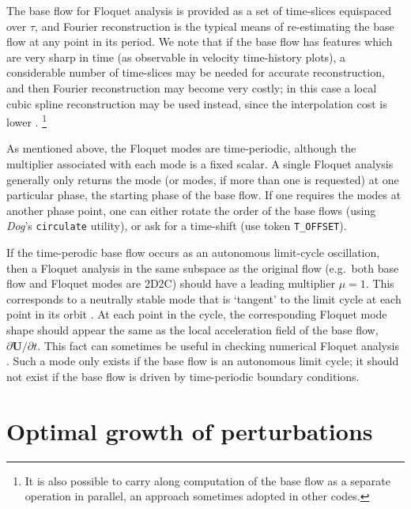 \documentclass[11pt,a4paper]{report}
\newcommand\Rey{\mbox{\textit{Re}}}
\newcommand{\eg}{e.g.\ }
\newcommand\Ubase{{\bm{U}}}
\newcommand{\Dog}{\emph{Dog}}
\begin{document}
The base flow for Floquet analysis is provided as a set of time-slices
equispaced over $\tau$, and Fourier reconstruction is the typical
means of re-estimating the base flow at any point in its period.  We
note that if the base flow has features which are very sharp in time
(as observable in velocity time-history plots), a considerable number
of time-slices may be needed for accurate reconstruction, and then
Fourier reconstruction may become very costly; in this case a local
cubic spline reconstruction may be used instead, since the
interpolation cost is lower \citep[][set \texttt{LAGRANGE\_INT=1} to
  obtain this functionality]{msb11}.
\footnote{It is also possible to carry along computation of the base flow as a
separate operation in parallel, an approach sometimes adopted in other
codes.}

As mentioned above, the Floquet modes are time-periodic, although the
multiplier associated with each mode is a fixed scalar.  A single
Floquet analysis generally only returns the mode (or modes, if more
than one is requested) at one particular phase, the starting phase of
the base flow. If one requires the modes at another phase point, one
can either rotate the order of the base flows (using \Dog's
\verb+circulate+ utility), or ask for a time-shift (use token
\verb+T_OFFSET+).

If the time-perodic base flow occurs as an autonomous limit-cycle
oscillation, then a Floquet analysis in the same subspace as the
original flow (\eg both base flow and Floquet modes are 2D2C) should
have a leading multiplier $\mu=1$.  This corresponds to a neutrally
stable mode that is `tangent' to the limit cycle at each point in its
orbit \citep{iooss90}.  At each point in the cycle, the corresponding
Floquet mode shape should appear the same as the local acceleration
field of the base flow, $\partial \Ubase/\partial t$.  This fact can
sometimes be useful in checking numerical Floquet analysis \citep[see
  e.g.][who approached 2D2C in the limit as $\beta\to0$ and found
  $\mu\to1$ over a range of $\Rey$]{bah96}.  Such a mode only exists
if the base flow is an autonomous limit cycle; it should not exist if
the base flow is driven by time-periodic boundary conditions.

\section{Optimal growth of perturbations}
\end{document}
